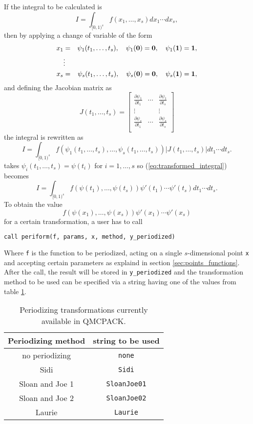 If the integral to be calculated is
\[
I = \int_{[0,1)^s}f(x_1,\ldots,x_s)dx_1\cdots dx_s,
\]
then by applying a change of variable of the form
\begin{eqnarray*}
x_1 & = & \psi_1(t_1,\ldots,t_s),\quad \psi_1({\bf 0})={\bf 0},\quad \psi_1({\bf 1})={\bf 1}, \\
    & \vdots & \\
x_s & = & \psi_s(t_1,\ldots,t_s),\quad \psi_s({\bf 0})={\bf 0},\quad \psi_s({\bf 1})={\bf 1},
\end{eqnarray*}
and defining the Jacobian matrix as
\[
J(t_1, \ldots, t_s) =
\left[
\begin{array}{ccc}
\frac{\partial \psi_1}{\partial t_1} & \cdots & \frac{\partial \psi_1}{\partial t_s} \\
\vdots & & \vdots \\
\frac{\partial \psi_s}{\partial t_1} & \cdots & \frac{\partial \psi_s}{\partial t_s} \\
\end{array}
\right]
\]
the integral is rewritten as
\begin{equation} \label{eq:transformed_integral}
I = \int_{[0,1)^s}f(\psi_1(t_1,\ldots,t_s),\ldots,\psi_s(t_1,\ldots,t_s))|J(t_1,\ldots,t_s)|dt_1\cdots dt_s.
\end{equation}
\qmcpack{} takes $\psi_i(t_1,\ldots,t_s)=\psi(t_i)$ for $i=1,\ldots,s$ so
(\ref{eq:transformed_integral}) becomes
\[
I = \int_{[0,1)^s} f(\psi(t_1),\ldots,\psi(t_s))\psi'(t_1) \cdots
\psi'(t_s)dt_1\cdots dt_s.
\]
To obtain the value
\[
f(\psi(x_1),\ldots,\psi(x_s))\psi'(x_1) \cdots \psi'(x_s)
\]
for a certain transformation, a user has to call
\begin{lstlisting}
call periform(f, params, x, method, y_periodized)
\end{lstlisting}
Where \verb!f! is the function to be periodized, acting on a single
$s$-dimensional point
\verb!x! and accepting certain parameters as explaind in
section \ref{sec:points_functions}.  After the call, the result will be stored
in \verb!y_periodized! and the transformation method to be used can be specified
via a string having one of the values from table \ref{tab:periodizers}.
\begin{table}
\centering
\begin{tabular}{|c|c|} \hline
Periodizing method & string to be used \\ \hline
no periodizing     & \verb!none! \\
Sidi               & \verb!Sidi! \\
Sloan and Joe 1    & \verb!SloanJoe01! \\
Sloan and Joe 2    & \verb!SloanJoe02! \\
Laurie             & \verb!Laurie! \\ \hline
\end{tabular}
\caption{Periodizing transformations currently available in QMCPACK.}
\label{tab:periodizers}
\end{table}

